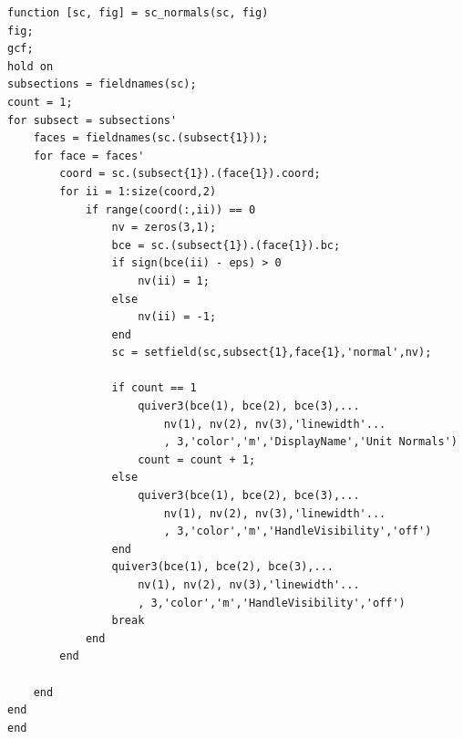 \documentclass[12pt,a4paper,notitlepage]{article}
\begin{document}
\begin{lstlisting}
function [sc, fig] = sc_normals(sc, fig)
fig;
gcf;
hold on
subsections = fieldnames(sc);
count = 1;
for subsect = subsections'
    faces = fieldnames(sc.(subsect{1}));
    for face = faces'
        coord = sc.(subsect{1}).(face{1}).coord;
        for ii = 1:size(coord,2)
            if range(coord(:,ii)) == 0
                nv = zeros(3,1);
                bce = sc.(subsect{1}).(face{1}).bc;
                if sign(bce(ii) - eps) > 0
                    nv(ii) = 1;
                else
                    nv(ii) = -1;
                end
                sc = setfield(sc,subsect{1},face{1},'normal',nv);
                
                if count == 1
                    quiver3(bce(1), bce(2), bce(3),...
                        nv(1), nv(2), nv(3),'linewidth'...
                        , 3,'color','m','DisplayName','Unit Normals')
                    count = count + 1;
                else
                    quiver3(bce(1), bce(2), bce(3),...
                        nv(1), nv(2), nv(3),'linewidth'...
                        , 3,'color','m','HandleVisibility','off')
                end
                quiver3(bce(1), bce(2), bce(3),...
                    nv(1), nv(2), nv(3),'linewidth'...
                    , 3,'color','m','HandleVisibility','off')
                break
            end
        end

    end
end
end
\end{lstlisting}
\end{document}

